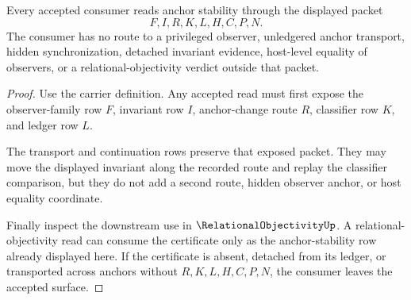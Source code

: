 \begin{theorem}
\label{thm:anchor-stability-certificate-nonescape}
Every accepted \AnchorStabilityCertificateUp{} consumer reads anchor stability through the displayed packet
$$
F,I,R,K,L,H,C,P,N.
$$
The consumer has no route to a privileged observer, unledgered anchor transport, hidden synchronization, detached invariant evidence, host-level equality of observers, or a relational-objectivity verdict outside that packet.
\end{theorem}
\begin{proof}
Use the carrier definition. Any accepted read must first expose the observer-family row $F$, invariant row $I$, anchor-change route $R$, classifier row $K$, and ledger row $L$.

The transport and continuation rows preserve that exposed packet. They may move the displayed invariant along the recorded route and replay the classifier comparison, but they do not add a second route, hidden observer anchor, or host equality coordinate.

Finally inspect the downstream use in $\RelationalObjectivityUp$. A relational-objectivity read can consume the certificate only as the anchor-stability row already displayed here. If the certificate is absent, detached from its ledger, or transported across anchors without $R,K,L,H,C,P,N$, the consumer leaves the accepted \AnchorStabilityCertificateUp{} surface.
\end{proof}

